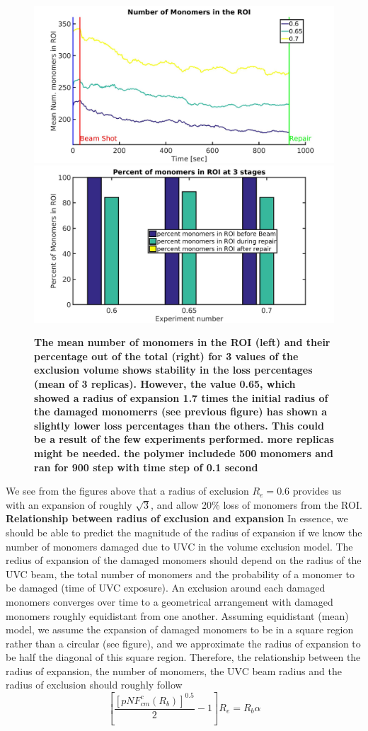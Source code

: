 \documentclass[12pt]{report}
\begin{document}
	\begin{figure}[H]
	\includegraphics[width=0.5\linewidth,height=0.3\textheight]{Images/ExludeAroundDamagedMonomers/BreakDamagedCrosslinks/06/meanNumMonomersInROI}
	\includegraphics[width=0.5\linewidth,height=0.3\textheight]{Images/ExludeAroundDamagedMonomers/BreakDamagedCrosslinks/06/percentOfMonomersInROI}
	\caption{\tiny{\textbf{The mean number of monomers in the ROI (left) and their percentage out of the total (right) for 3 values of the exclusion volume shows stability in the loss percentages (mean of 3 replicas). However, the value 0.65, which showed a radius of expansion 1.7 times the initial radius of the damaged monomerrs (see previous figure) has shown a slightly lower loss percentages than the others. This could be a result of the few experiments performed. more replicas might be needed. the polymer includede 500 monomers and ran for 900 step with time step of 0.1 second}}}
	\label{fig:meanNumMonomersInROIVolumeOfExclusionParameterFitting}
	\end{figure}
	   
   We see from the figures above that a radius of exclusion $R_e=0.6$ provides us with an expansion of roughly $\sqrt{3}$, and allow 20\% loss of monomers from the ROI. \\
         
   \textbf{\large{Relationship between radius of exclusion and expansion}}   
   In essence, we should be able to predict the magnitude of the radius of expansion if we know the number of monomers damaged due to UVC in the volume exclusion model. 
   The redius of expansion of the damaged monomers should depend on the radius of the UVC beam, the total number of monomers and the probability of a monomer to be damaged (time of UVC exposure).
   An exclusion around each damaged monomers converges over time to a geometrical arrangement with damaged monomers roughly equidistant from one another. Assuming equidistant (mean) model, we assume the expansion of damaged monomers to be in a square region rather than a circular (see figure), and we approximate the radius of expansion to be half the diagonal of this square region. Therefore, the relationship between the radius of expansion, the number of monomers, the UVC beam radius and the radius of exclusion should roughly follow
   \begin{equation*}
   \left[\frac{[pNF_{cm}^c(R_b)]^{0.5}}{2}-1 \right]R_e = R_b\alpha
   \end{equation*}
   
\end{document}
